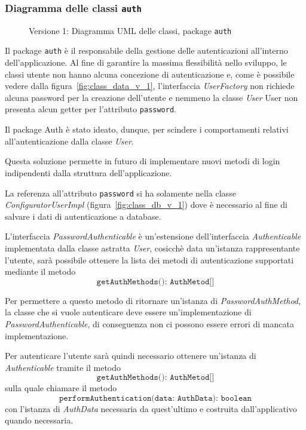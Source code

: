 \subsubsection{Diagramma delle classi \texttt{auth}}
\vspace{0.5cm}
\begin{figure}[H]
    \centering
    \caption{Versione 1: Diagramma UML delle classi, package \texttt{auth}}
    \label{fig:class_auth_v_1}
\end{figure}

Il package \texttt{auth} è il responsabile della gestione delle autenticazioni all'interno dell'applicazione.
Al fine di garantire la massima flessibilità nello sviluppo, le classi utente non hanno alcuna concezione di autenticazione
e, come è possibile vedere dalla figura~\ref{fig:class_data_v_1}, l'interfaccia \textit{UserFactory} non richiede alcuna password
per la creazione dell'utente e nemmeno la classe \textit{User} User non presenta alcun getter per l'attributo \texttt{password}.

Il package Auth è stato ideato, dunque, per scindere i comportamenti relativi all'autenticazione dalla classe \textit{User}.

Questa soluzione permette in futuro di implementare nuovi metodi di login indipendenti dalla struttura dell'applicazione.

La referenza all'attributo \texttt{password} si ha solamente nella classe \textit{ConfiguratorUserImpl} (figura~\ref{fig:class_db_v_1})
dove è necessario al fine di salvare i dati di autenticazione a database.

L'interfaccia \textit{PasswordAuthenticable} è un'estensione dell'interfaccia \textit{Authenticable} implementata dalla classe astratta
\textit{User}, cosicchè data un'istanza rappresentante l'utente, sarà possibile ottenere la lista dei metodi di autenticazione supportati
mediante il metodo \[ \texttt{getAuthMethods(): AuthMetod[]} \]

Per permettere a questo metodo di ritornare un'istanza di \textit{PasswordAuthMethod}, la classe che si vuole autenticare deve essere un'implementazione
di \textit{PasswordAuthenticable}, di conseguenza non ci possono essere errori di mancata implementazione.

Per autenticare l'utente sarà quindi necessario ottenere un'istanza di \textit{Authenticable} tramite il metodo \[ \texttt{getAuthMethods(): AuthMetod[]} \]
sulla quale chiamare il metodo \[\texttt{performAuthentication(data: AuthData): boolean}\] con l'istanza di \textit{AuthData}
necessaria da quest'ultimo e costruita dall'applicativo quando necessaria.